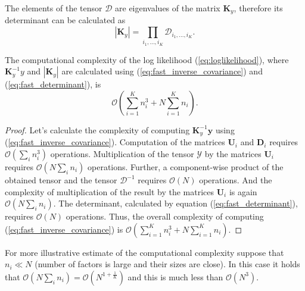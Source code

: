 The elements of the tensor $\mathcal{D}$ are eigenvalues of the matrix $\mathbf{K}_y$,
therefore its determinant can be calculated as
\begin{equation}
  \label{eq:fast_determinant}
  |\mathbf{K}_y| = \prod_{i_1, \ldots, i_K} \mathcal{D}_{i_1, \ldots, i_K}.
\end{equation}

\begin{proposition}
  The computational complexity of the log likelihood (\ref{eq:loglikelihood}), where $\mathbf{K}_y^{-1}y$ and
  $|\mathbf{K}_y|$ are calculated using (\ref{eq:fast_inverse_covariance}) and (\ref{eq:fast_determinant}), is
  \begin{equation}
    \mathcal{O} \left (\sum_{i = 1}^K n_i^3 + N\sum_{i = 1}^K n_i \right ).
  \end{equation}
\end{proposition}
\begin{proof}
  Let's calculate the complexity of computing $\mathbf{K}_y^{-1} \mathbf{y}$ using (\ref{eq:fast_inverse_covariance}).
  Computation of the matrices $\mathbf{U}_i$ and $\mathbf{D}_i$ requires $\mathcal{O}(\sum_i n_i^3)$ operations.
  Multiplication of the tensor $\mathcal{Y}$ by the matrices $\mathbf{U}_i$ requires $\mathcal{O}(N\sum_i n_i)$ operations.
  Further, a component-wise product of the obtained tensor and the tensor $\mathcal{D}^{-1}$ requires $\mathcal{O}(N)$
  operations.
  And the complexity of multiplication of the result by the matrices $\mathbf{U}_i$ is again $\mathcal{O}(N\sum_i n_i)$.
  The determinant, calculated by equation (\ref{eq:fast_determinant}), requires $\mathcal{O}(N)$ operations.
  Thus, the overall complexity of computing (\ref{eq:fast_inverse_covariance}) is
  ${\mathcal{O}(\sum_{i = 1}^K n_i^3 + N\sum_{i = 1}^K n_i)}$.
\end{proof}

For more illustrative estimate of the computational complexity
suppose that $n_i \ll N$ (number of factors is large and their sizes are close).
In this case it holds that
$\mathcal{O}(N\sum_i n_i) = \mathcal{O}(N^{1 + \frac{1}{K}})$ and this is
much less than $\mathcal{O}(N^3)$.

